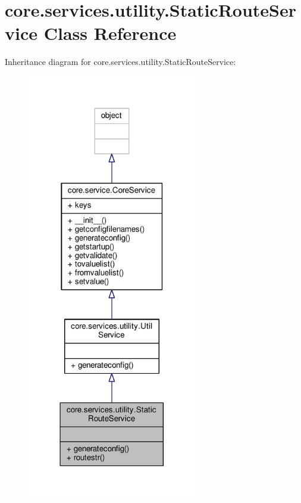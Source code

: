 \hypertarget{classcore_1_1services_1_1utility_1_1_static_route_service}{\section{core.\+services.\+utility.\+Static\+Route\+Service Class Reference}
\label{classcore_1_1services_1_1utility_1_1_static_route_service}
}


Inheritance diagram for core.\+services.\+utility.\+Static\+Route\+Service\+:
\nopagebreak
\begin{figure}[H]
\begin{center}
\leavevmode
\includegraphics[width=210pt]{classcore_1_1services_1_1utility_1_1_static_route_service__inherit__graph}
\end{center}
\end{figure}


